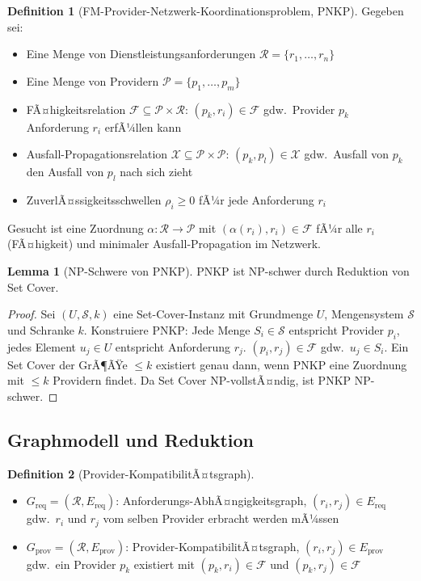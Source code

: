﻿\documentclass[a4paper,12pt]{article}
\theoremstyle{definition}
\newtheorem{definition}{Definition}[section]
\newtheorem{lemma}{Lemma}[section]
\begin{document}
\begin{definition}[FM-Provider-Netzwerk-Koordinationsproblem, PNKP]
\label{def:pnkp}
Gegeben sei:
\begin{itemize}
    \item Eine Menge von Dienstleistungsanforderungen $\mathcal{R} = \{r_1, \ldots, r_n\}$
    \item Eine Menge von Providern $\mathcal{P} = \{p_1, \ldots, p_m\}$
    \item FÃ¤higkeitsrelation $\mathcal{F} \subseteq \mathcal{P} \times \mathcal{R}$:
          $(p_k, r_i) \in \mathcal{F}$ gdw.\ Provider $p_k$ Anforderung $r_i$ erfÃ¼llen kann
    \item Ausfall-Propagationsrelation $\mathcal{X} \subseteq \mathcal{P} \times \mathcal{P}$:
          $(p_k, p_l) \in \mathcal{X}$ gdw.\ Ausfall von $p_k$ den Ausfall von $p_l$ nach sich zieht
    \item ZuverlÃ¤ssigkeitsschwellen $\rho_i \geq 0$ fÃ¼r jede Anforderung $r_i$
\end{itemize}
Gesucht ist eine Zuordnung $\alpha: \mathcal{R} \to \mathcal{P}$ mit
$(\alpha(r_i), r_i) \in \mathcal{F}$ fÃ¼r alle $r_i$ (FÃ¤higkeit) und
minimaler Ausfall-Propagation im Netzwerk.
\end{definition}

\begin{lemma}[NP-Schwere von PNKP]
\label{lem:pnkp-np}
PNKP ist NP-schwer durch Reduktion von Set Cover.
\end{lemma}

\begin{proof}
Sei $(U, \mathcal{S}, k)$ eine Set-Cover-Instanz mit Grundmenge $U$,
Mengensystem $\mathcal{S}$ und Schranke $k$.
Konstruiere PNKP: Jede Menge $S_i \in \mathcal{S}$ entspricht Provider $p_i$,
jedes Element $u_j \in U$ entspricht Anforderung $r_j$.
$(p_i, r_j) \in \mathcal{F}$ gdw.\ $u_j \in S_i$.
Ein Set Cover der GrÃ¶ÃŸe $\leq k$ existiert genau dann, wenn PNKP eine Zuordnung
mit $\leq k$ Providern findet.
Da Set Cover NP-vollstÃ¤ndig, ist PNKP NP-schwer.
\end{proof}

\subsection{Graphmodell und Reduktion}

\begin{definition}[Provider-KompatibilitÃ¤tsgraph]
\label{def:pkg}
\begin{itemize}
    \item $G_{\mathrm{req}} = (\mathcal{R}, E_{\mathrm{req}})$: Anforderungs-AbhÃ¤ngigkeitsgraph,
          $(r_i, r_j) \in E_{\mathrm{req}}$ gdw.\ $r_i$ und $r_j$ vom selben Provider erbracht werden mÃ¼ssen
    \item $G_{\mathrm{prov}} = (\mathcal{R}, E_{\mathrm{prov}})$: Provider-KompatibilitÃ¤tsgraph,
          $(r_i, r_j) \in E_{\mathrm{prov}}$ gdw.\ ein Provider $p_k$ existiert mit
          $(p_k, r_i) \in \mathcal{F}$ und $(p_k, r_j) \in \mathcal{F}$
\end{itemize}
\end{definition}
\end{document}
